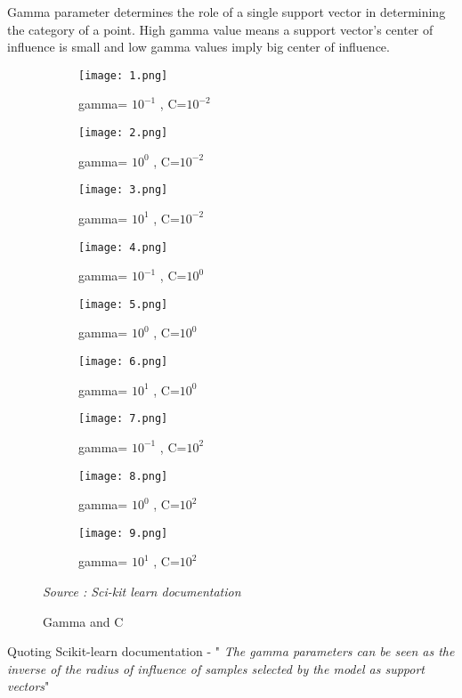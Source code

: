 \documentclass{report}
\begin{document}
\begin{enumerate}
Gamma parameter determines the role of a single support vector in determining the category of a point.
High gamma value means a support vector's center of influence is small and low gamma values imply big center of influence.
\begin{figure}[!h]
\centering
\begin{subfigure}[]{0.3\textwidth}
  \texttt{[image: 1.png]}
  \caption{gamma= \(10^{-1} \) , C=\(10^{-2} \)}
  \label{Fig:2}
\end{subfigure}
\begin{subfigure}[]{0.3\textwidth}
  \texttt{[image: 2.png]}
  \caption{gamma= \(10^{0} \) , C=\(10^{-2} \)}
  \label{Fig:2}
\end{subfigure}
\begin{subfigure}[]{0.3\textwidth}
  \texttt{[image: 3.png]}
  \caption{gamma= \(10^{1} \) , C=\(10^{-2} \)}
  \label{Fig:2}
\end{subfigure}

\begin{subfigure}[]{0.3\textwidth}
  \texttt{[image: 4.png]}
  \caption{gamma= \(10^{-1} \) , C=\(10^{0} \)}
  \label{Fig:2}
\end{subfigure}
\begin{subfigure}[]{0.3\textwidth}
  \texttt{[image: 5.png]}
  \caption{gamma= \(10^{0} \) , C=\(10^{0} \)}
  \label{Fig:2}
\end{subfigure}
\begin{subfigure}[]{0.3\textwidth}
  \texttt{[image: 6.png]}
  \caption{gamma= \(10^{1} \) , C=\(10^{0} \)}
  \label{Fig:2}
\end{subfigure}
\begin{subfigure}[]{0.3\textwidth}
  \texttt{[image: 7.png]}
  \caption{gamma= \(10^{-1} \) , C=\(10^{2} \)}
  \label{Fig:2}
\end{subfigure}
\begin{subfigure}[]{0.3\textwidth}
  \texttt{[image: 8.png]}
  \caption{gamma= \(10^{0} \) , C=\(10^{2} \)}
  \label{Fig:2}
\end{subfigure}
\begin{subfigure}[]{0.3\textwidth}
  \texttt{[image: 9.png]}
  \caption{gamma= \(10^{1} \) , C=\(10^{2} \)}
  \label{Fig:2}
\end{subfigure}
\caption{ Gamma and C}
\emph{\normalsize Source : Sci-kit learn documentation}
\end{figure}
\end{enumerate}
\Large
\pagebreak
Quoting Scikit-learn documentation - " \emph{The gamma parameters can be seen as the inverse of the radius of influence of samples selected by the model as support vectors}"
\linebreak
 
\end{document}
